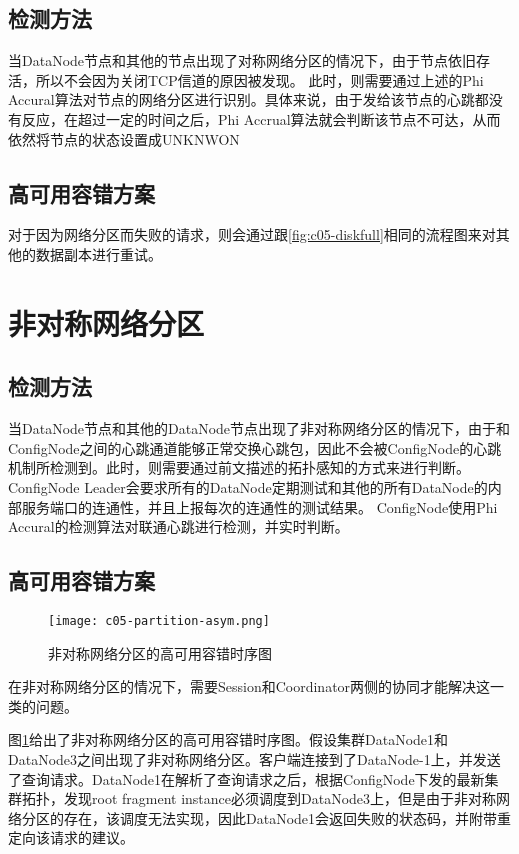 \subsection{检测方法}
当DataNode节点和其他的节点出现了对称网络分区的情况下，由于节点依旧存活，所以不会因为关闭TCP信道的原因被发现。
此时，则需要通过上述的Phi Accural算法对节点的网络分区进行识别。具体来说，由于发给该节点的心跳都没有反应，在超过一定的时间之后，Phi Accrual算法就会判断该节点不可达，从而依然将节点的状态设置成UNKNWON

\subsection{高可用容错方案}

对于因为网络分区而失败的请求，则会通过跟\ref{fig:c05-diskfull}相同的流程图来对其他的数据副本进行重试。

\section{非对称网络分区}

\subsection{检测方法}
当DataNode节点和其他的DataNode节点出现了非对称网络分区的情况下，由于和ConfigNode之间的心跳通道能够正常交换心跳包，因此不会被ConfigNode的心跳机制所检测到。此时，则需要通过前文描述的拓扑感知的方式来进行判断。ConfigNode Leader会要求所有的DataNode定期测试和其他的所有DataNode的内部服务端口的连通性，并且上报每次的连通性的测试结果。
ConfigNode使用Phi Accural的检测算法对联通心跳进行检测，并实时判断。

\subsection{高可用容错方案}

\begin{figure}
    \centering
    \texttt{[image: c05-partition-asym.png]}
    \caption{非对称网络分区的高可用容错时序图}
    \label{fig:c05-partition-asym}
\end{figure}

在非对称网络分区的情况下，需要Session和Coordinator两侧的协同才能解决这一类的问题。

图\ref{fig:c05-partition-asym}给出了非对称网络分区的高可用容错时序图。假设集群DataNode1和DataNode3之间出现了非对称网络分区。客户端连接到了DataNode-1上，并发送了查询请求。DataNode1在解析了查询请求之后，根据ConfigNode下发的最新集群拓扑，发现root fragment instance必须调度到DataNode3上，但是由于非对称网络分区的存在，该调度无法实现，因此DataNode1会返回失败的状态码，并附带重定向该请求的建议。

